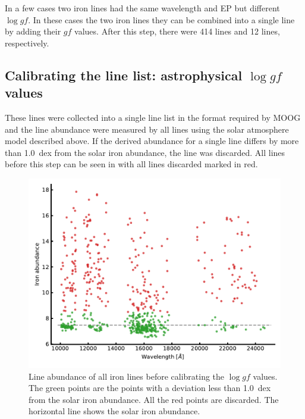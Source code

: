 In a few cases two iron lines had the same wavelength and EP but different $\log \mathit{gf}$. In
these cases the two iron lines they can be combined into a single line by adding their $\mathit{gf}$
values. After this step, there were 414  lines and 12  lines, respectively.



\subsection{Calibrating the line list: astrophysical \texorpdfstring{$\log \mathit{gf}$}{log gf} values}

These lines were collected into a single line list in the format required by MOOG \citep{Sneden1973}
and the line abundance were measured by all lines using the solar atmosphere model described above.
If the derived abundance for a single line differs by more than \SI{1.0}{dex} from the solar iron
abundance, the line was discarded. All lines before this step can be seen in
 with all lines discarded marked in red.

\begin{figure}[htpb!]
    \centering
    \includegraphics[width=1.0\linewidth]{figures/calibrated_loggf.pdf}
    \caption{Line abundance of all iron lines before calibrating the $\log \mathit{gf}$ values. The
             green points are the points with a deviation less than \SI{1.0}{dex} from the solar
             iron abundance. All the red points are discarded. The horizontal line shows the solar
             iron abundance.}
    \label{fig:calibrated_loggf}
\end{figure}


